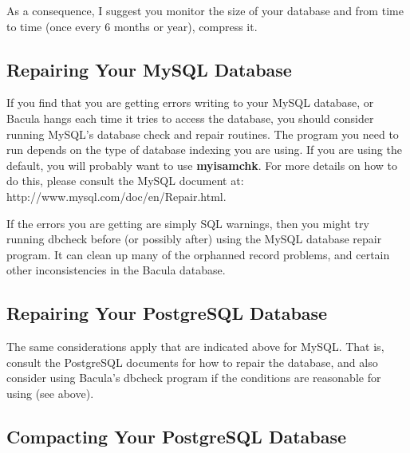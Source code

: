 As a consequence, I suggest you monitor the size of your database and from
time to time (once every 6 months or year), compress it. 
\label{RepairingMySQL}

\subsection*{Repairing Your MySQL Database}

If you find that you are getting errors writing to your MySQL database, or
Bacula hangs each time it tries to access the database, you should consider
running MySQL's database check and repair routines. The program you need to
run depends on the type of database indexing you are using. If you are using
the default, you will probably want to use {\bf myisamchk}. For more details
on how to do this, please consult the MySQL document at: 
{http://www.mysql.com/doc/en/Repair.html}. 

If the errors you are getting are simply SQL warnings, then you might try
running dbcheck before (or possibly after) using the MySQL database repair
program. It can clean up many of the orphanned record problems, and certain
other inconsistencies in the Bacula database. 
\label{RepairingPSQL}

\subsection*{Repairing Your PostgreSQL Database}

The same considerations apply that are indicated above for MySQL. That is,
consult the PostgreSQL documents for how to repair the database, and also
consider using Bacula's dbcheck program if the conditions are reasonable for
using (see above). 
\label{CompactingPostgres}

\subsection*{Compacting Your PostgreSQL Database}

